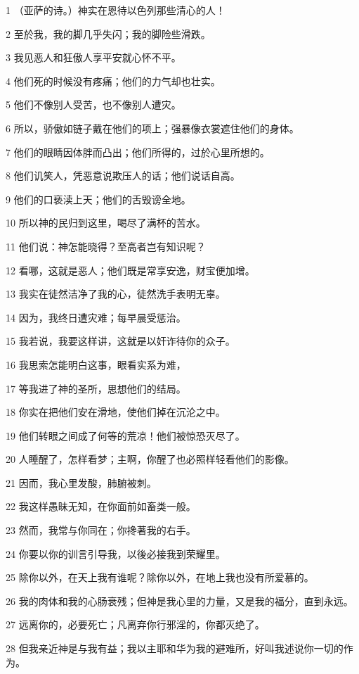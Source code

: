 \par 1 （亚萨的诗。）神实在恩待以色列那些清心的人！
\par 2 至於我，我的脚几乎失闪；我的脚险些滑跌。
\par 3 我见恶人和狂傲人享平安就心怀不平。
\par 4 他们死的时候没有疼痛；他们的力气却也壮实。
\par 5 他们不像别人受苦，也不像别人遭灾。
\par 6 所以，骄傲如链子戴在他们的项上；强暴像衣裳遮住他们的身体。
\par 7 他们的眼睛因体胖而凸出；他们所得的，过於心里所想的。
\par 8 他们讥笑人，凭恶意说欺压人的话；他们说话自高。
\par 9 他们的口亵渎上天；他们的舌毁谤全地。
\par 10 所以神的民归到这里，喝尽了满杯的苦水。
\par 11 他们说：神怎能晓得？至高者岂有知识呢？
\par 12 看哪，这就是恶人；他们既是常享安逸，财宝便加增。
\par 13 我实在徒然洁净了我的心，徒然洗手表明无辜。
\par 14 因为，我终日遭灾难；每早晨受惩治。
\par 15 我若说，我要这样讲，这就是以奸诈待你的众子。
\par 16 我思索怎能明白这事，眼看实系为难，
\par 17 等我进了神的圣所，思想他们的结局。
\par 18 你实在把他们安在滑地，使他们掉在沉沦之中。
\par 19 他们转眼之间成了何等的荒凉！他们被惊恐灭尽了。
\par 20 人睡醒了，怎样看梦；主啊，你醒了也必照样轻看他们的影像。
\par 21 因而，我心里发酸，肺腑被刺。
\par 22 我这样愚昧无知，在你面前如畜类一般。
\par 23 然而，我常与你同在；你搀著我的右手。
\par 24 你要以你的训言引导我，以後必接我到荣耀里。
\par 25 除你以外，在天上我有谁呢？除你以外，在地上我也没有所爱慕的。
\par 26 我的肉体和我的心肠衰残；但神是我心里的力量，又是我的福分，直到永远。
\par 27 远离你的，必要死亡；凡离弃你行邪淫的，你都灭绝了。
\par 28 但我亲近神是与我有益；我以主耶和华为我的避难所，好叫我述说你一切的作为。

